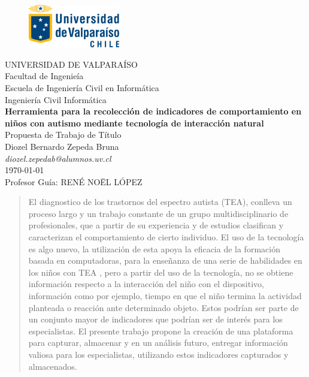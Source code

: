 \documentclass[12pt,letterpaper]{article}
\begin{document}
\begin{center}
\begin{figure}[ht]
\begin{center}
\includegraphics[width=4cm]{logoUV.png}
\end{center}
\end{figure}
\thispagestyle{empty}

UNIVERSIDAD DE VALPARA\'ISO \\
Facultad de Ingenie\'ia \\
Escuela de Ingenier\'ia Civil en Inform\'atica \\
Ingenier\'ia Civil Inform\'atica\\
\vspace{1cm}
\Large
\textbf{Herramienta para la recolecci\'on de indicadores de comportamiento en ni\~nos con autismo 
mediante tecnolog\'ia de interacci\'on natural}\\ 
\large 
Propuesta de Trabajo de T\'itulo \\
Diozel Bernardo Zepeda Bruna \\
\normalsize
\emph{diozel.zepedab@alumnos.uv.cl} \\
\today \\
\vspace{1cm}
Profesor Gu\'ia:
REN\'E NO\"EL L\'OPEZ
\end{center}



\begin{abstract}


El diagnostico de los trastornos del espectro autista (TEA), conlleva un proceso largo 
y un trabajo constante de un grupo multidisciplinario de profesionales, que a partir de 
su experiencia y de estudios clasifican y caracterizan el comportamiento de cierto individuo. 
El uso de la tecnolog\'ia es algo nuevo, la utilizaci\'on de esta apoya la eficacia de la 
formaci\'on basada en computadoras, para la ense\~nanza de una serie de habilidades en los 
ni\~nos con TEA \cite{REF1}, pero a partir del uso de la tecnolog\'ia, no se obtiene informaci\'on 
respecto a la interacci\'on del ni\~no con el dispositivo, informaci\'on como por ejemplo, 
tiempo en que el ni\~no termina la actividad planteada o reacci\'on ante determinado objeto. 
Estos podr\'ian ser parte de un conjunto mayor de indicadores que podr\'ian ser de inter\'es 
para los especialistas. El presente trabajo propone la creaci\'on de una plataforma para 
capturar, almacenar y en un an\'alisis futuro, entregar informaci\'on valiosa para los 
especialistas, utilizando estos indicadores capturados y almacenados.


\end{abstract}
\end{document}
